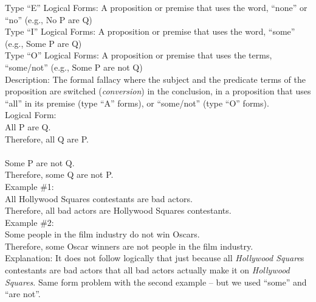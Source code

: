 \documentclass[a4paper,12pt,single,pdftex]{scrbook}
\begin{document}
    
      Type “E” Logical Forms: A proposition or premise that uses the word, “none” or “no” (e.g., No P are Q)
    \\

    
      Type “I” Logical Forms: A proposition or premise that uses the word, “some” (e.g., Some P are Q)
    \\

    
      Type “O” Logical Forms: A proposition or premise that uses the terms, “some/not” (e.g., Some P are not Q)
    \\

    
      Description: The formal fallacy where the subject and the predicate terms of the proposition are switched ({\it conversion}) in the conclusion, in a proposition that uses “all” in its premise (type “A” forms), or “some/not” (type “O” forms).
    \\

    
      Logical Form:
    \\

    
      All P are Q.
    \\

    
      Therefore, all Q are P.
    \\

    
       
    \\

    
      Some P are not Q.
    \\

    
      Therefore, some Q are not P.
    \\

    
      Example \#1:
    \\

    
      All Hollywood Squares contestants are bad actors.
    \\

    
      Therefore, all bad actors are Hollywood Squares contestants.
    \\

    
      Example \#2:
    \\

    
      Some people in the film industry do not win Oscars.
    \\

    
      Therefore, some Oscar winners are not people in the film industry.
    \\

    
      Explanation: It does not follow logically that just because all {\it Hollywood Square}s contestants are bad actors that all bad actors actually make it on {\it Hollywood Squares}.  Same form problem with the second example -- but we used “some” and “are not”.
    \\
\end{document}
